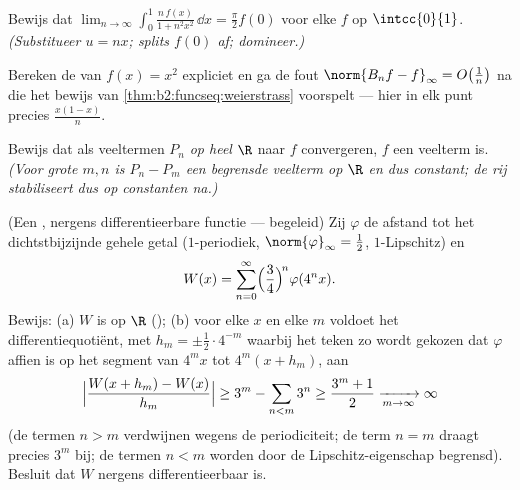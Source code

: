 \begin{exercise}[$\star\star$]\label{exo:b2:funcseq:6}
Bewijs dat $\displaystyle\lim_{n\to\infty} \int_0^1
\frac{n\,f(x)}{1 + n^2x^2}\,\dd x = \frac{\pi}{2} f(0)$ voor elke
 $f$ op $\intcc{0}{1}$. \emph{(Substitueer $u = nx$; splits
$f(0)$ af; domineer.)}
\end{exercise}

\begin{exercise}[$\star\star$]\label{exo:b2:funcseq:7}
Bereken de  van $f(x) = x^2$ expliciet en ga de
 fout $\norm{B_n f - f}_\infty = O\bigl(\frac1n\bigr)$ na
die het bewijs van \cref{thm:b2:funcseq:weierstrass} voorspelt ---
hier in elk punt precies $\frac{x(1 - x)}{n}$.
\end{exercise}

\begin{exercise}[$\star\star$]\label{exo:b2:funcseq:8}
Bewijs dat als veeltermen $P_n$ \emph{op heel $\R$}  naar
$f$ convergeren, $f$ een veelterm is. \emph{(Voor grote $m, n$ is
$P_n - P_m$ een begrensde veelterm op $\R$ en dus constant; de rij
stabiliseert dus op constanten na.)}
\end{exercise}

\begin{exercise}[$\star\star\star$]\label{exo:b2:funcseq:9}
(Een , nergens differentieerbare functie --- begeleid) Zij
$\varphi$ de afstand tot het dichtstbijzijnde gehele getal
($1$-periodiek, $\norm{\varphi}_\infty = \frac12$,
$1$-Lipschitz) en
\[
W(x) = \sum_{n=0}^{\infty} \Bigl(\frac{3}{4}\Bigr)^{\!n}
\varphi(4^n x) .
\]
Bewijs: (a) $W$ is  op $\R$ (); (b) voor
elke $x$ en elke $m$ voldoet het differentiequotiënt, met $h_m =
\pm\frac12\cdot 4^{-m}$ waarbij het teken zo wordt gekozen dat
$\varphi$ affien is op het segment van $4^m x$ tot $4^m(x + h_m)$,
aan
\[
\Bigl|\frac{W(x + h_m) - W(x)}{h_m}\Bigr| \geq 3^m -
\sum_{n<m} 3^n \geq \frac{3^m + 1}{2} \xrightarrow[m\to\infty]{}
\infty
\]
(de termen $n > m$ verdwijnen wegens de periodiciteit; de term $n =
m$ draagt precies $3^m$ bij; de termen $n < m$ worden door de
Lipschitz-eigenschap begrensd). Besluit dat $W$ nergens
differentieerbaar is.
\end{exercise}


